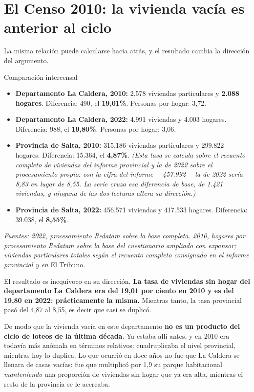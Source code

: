\section{El Censo 2010: la vivienda vacía es anterior al ciclo}

La misma relación puede calcularse hacia atrás, y el resultado cambia la dirección del argumento.

\begin{ficha}{Comparación intercensal}
\begin{itemize}[leftmargin=*,nosep]
\item \textbf{Departamento La Caldera, 2010:} 2.578 viviendas particulares y \textbf{2.088 hogares}. Diferencia: 490, el \textbf{19,01\%}. Personas por hogar: 3,72.
\item \textbf{Departamento La Caldera, 2022:} 4.991 viviendas y 4.003 hogares. Diferencia: 988, el \textbf{19,80\%}. Personas por hogar: 3,06.
\item \textbf{Provincia de Salta, 2010:} 315.186 viviendas particulares y 299.822 hogares. Diferencia: 15.364, el \textbf{4,87\%}. \textit{(Esta tasa se calcula sobre el recuento completo de viviendas del informe provincial y la de 2022 sobre el procesamiento propio: con la cifra del informe ---457.992--- la de 2022 sería 8,83 en lugar de 8,55. La serie cruza esa diferencia de base, de 1.421 viviendas, y ninguna de las dos lecturas altera su dirección.)}
\item \textbf{Provincia de Salta, 2022:} 456.571 viviendas y 417.533 hogares. Diferencia: 39.038, el \textbf{8,55\%}.
\end{itemize}
\textit{Fuentes: 2022, procesamiento Redatam sobre la base completa. 2010, hogares por procesamiento Redatam sobre la base del cuestionario ampliado con expansor; viviendas particulares totales según el recuento completo consignado en el informe provincial y en} El Tribuno.
\end{ficha}

El resultado es inequívoco en su dirección. \textbf{La tasa de viviendas sin hogar del departamento La Caldera era del 19,01 por ciento en 2010 y es del 19,80 en 2022: prácticamente la misma.} Mientras tanto, la tasa provincial pasó del 4,87 al 8,55, es decir que casi se duplicó.

De modo que la vivienda vacía en este departamento \textbf{no es un producto del ciclo de loteos de la última década}. Ya estaba allí antes, y en 2010 era todavía más anómala en términos relativos: cuadruplicaba el nivel provincial, mientras hoy lo duplica. Lo que ocurrió en doce años no fue que La Caldera se llenara de casas vacías: fue que multiplicó por 1,9 su parque habitacional \textit{manteniendo} una proporción de viviendas sin hogar que ya era alta, mientras el resto de la provincia se le acercaba.

